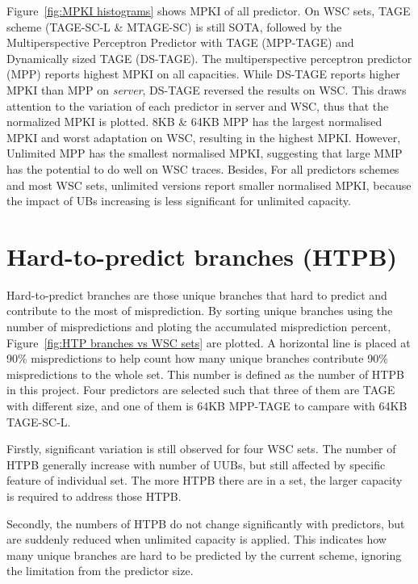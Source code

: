 Figure~\ref{fig:MPKI histograms} shows MPKI of all predictor. On WSC sets, TAGE scheme (TAGE-SC-L \& MTAGE-SC) is still SOTA, followed by the Multiperspective Perceptron Predictor with TAGE (MPP-TAGE) and Dynamically sized TAGE (DS-TAGE). The multiperspective perceptron predictor (MPP) reports highest MPKI on all capacities. While DS-TAGE reports higher MPKI than MPP on \textit{server}, DS-TAGE reversed the results on WSC. This draws attention to the variation of each predictor in server and WSC, thus that the normalized MPKI is plotted. 8KB \& 64KB MPP has the largest normalised MPKI and worst adaptation on WSC, resulting in the highest MPKI. However, Unlimited MPP has the smallest normalised MPKI, suggesting that large MMP has the potential to do well on WSC traces. Besides, For all predictors schemes and most WSC sets, unlimited versions report smaller normalised MPKI, because the impact of UBs increasing is less significant for unlimited capacity.


\section{Hard-to-predict branches (HTPB)}

Hard-to-predict branches are those unique branches that hard to predict and contribute to the most of misprediction. By sorting unique branches using the number of mispredictions and ploting the accumulated misprediction percent, Figure~\ref{fig:HTP branches vs WSC sets} are plotted. A horizontal line is placed at 90\% mispredictions to help count how many unique branches contribute 90\% mispredictions to the whole set. This number is defined as the number of HTPB in this project. Four predictors are selected such that three of them are TAGE with different size, and one of them is 64KB MPP-TAGE to campare with 64KB TAGE-SC-L.\par\hspace*{\fill}\par

Firstly, significant variation is still observed for four WSC sets. The number of HTPB generally increase with number of UUBs, but still affected by specific feature of individual set. The more HTPB there are in a set, the larger capacity is required to address those HTPB.\par\hspace*{\fill}\par

Secondly, the numbers of HTPB do not change significantly with predictors, but are suddenly reduced when unlimited capacity is applied. This indicates how many unique branches are hard to be predicted by the current scheme, ignoring the limitation from the predictor size.


